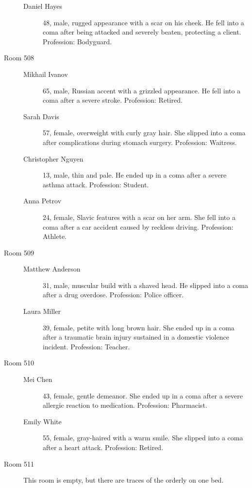 \documentclass[bg-full]{resources/stylesheets/kult}
\begin{document}
\begin{description}
\begin{description}
      \item[Daniel Hayes] 48, male, rugged appearance with a scar on his cheek. He fell into a coma after being attacked and severely beaten, protecting a client. Profession: Bodyguard.
    \end{description}
  \item[Room 508]
    \begin{description}
      \item[Mikhail Ivanov] 65, male, Russian accent with a grizzled appearance. He fell into a coma after a severe stroke. Profession: Retired.
      \item[Sarah Davis] 57, female, overweight with curly gray hair. She slipped into a coma after complications during stomach surgery. Profession: Waitress.
      \item[Christopher Nguyen] 13, male, thin and pale. He ended up in a coma after a severe asthma attack. Profession: Student.
      \item[Anna Petrov] 24, female, Slavic features with a scar on her arm. She fell into a coma after a car accident caused by reckless driving. Profession: Athlete.
    \end{description}
  \item[Room 509]
    \begin{description}
      \item[Matthew Anderson] 31, male, muscular build with a shaved head. He slipped into a coma after a drug overdose. Profession: Police officer.
      \item[Laura Miller] 39, female, petite with long brown hair. She ended up in a coma after a traumatic brain injury sustained in a domestic violence incident. Profession: Teacher.
    \end{description}
  \item[Room 510]
    \begin{description}
      \item[Mei Chen] 43, female, gentle demeanor. She ended up in a coma after a severe allergic reaction to medication. Profession: Pharmacist.
      \item[Emily White] 55, female, gray-haired with a warm smile. She slipped into a coma after a heart attack. Profession: Retired.
    \end{description}
  \item[Room 511]
    This room is empty, but there are traces of the orderly on one bed.
\end{description}
\end{document}
